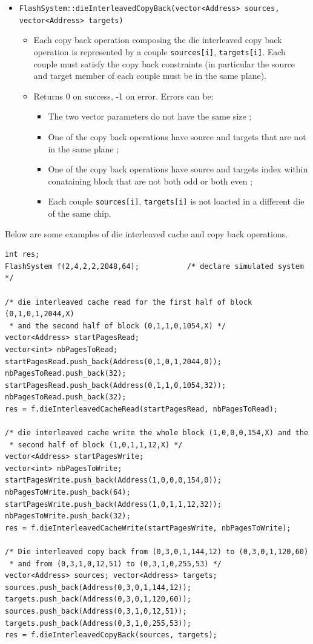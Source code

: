 \begin{itemize}
  \item \verb+FlashSystem::dieInterleavedCopyBack(vector<Address> sources,+\\\verb+vector<Address> targets)+
  \begin{itemize}
    \item Each copy back operation composing the die interleaved copy back operation is represented by a couple \verb+sources[i]+, \verb+targets[i]+. Each couple must satisfy the copy back constraints (in particular the source and target member of each couple must be in the same plane).
    \item Returns 0 on success, -1 on error. Errors can be:
    \begin{itemize}
      \item The two vector parameters do not have the same size ;
      \item One of the copy back operations have source and targets that are not in the same plane ;
      \item One of the copy back operations have source and targets index within conataining block that are not both odd or both even ;
      \item Each couple \verb+sources[i]+, \verb+targets[i]+ is not loacted in a different die of the same chip.
    \end{itemize}
  \end{itemize}
\end{itemize}

Below are some examples of die interleaved cache and copy back operations.

\begin{lstlisting}
int res;
FlashSystem f(2,4,2,2,2048,64);           /* declare simulated system */

/* die interleaved cache read for the first half of block (0,1,0,1,2044,X)
 * and the second half of block (0,1,1,0,1054,X) */
vector<Address> startPagesRead;
vector<int> nbPagesToRead;
startPagesRead.push_back(Address(0,1,0,1,2044,0)); nbPagesToRead.push_back(32);
startPagesRead.push_back(Address(0,1,1,0,1054,32)); nbPagesToRead.push_back(32);
res = f.dieInterleavedCacheRead(startPagesRead, nbPagesToRead);

/* die interleaved cache write the whole block (1,0,0,0,154,X) and the 
 * second half of block (1,0,1,1,12,X) */
vector<Address> startPagesWrite;
vector<int> nbPagesToWrite;
startPagesWrite.push_back(Address(1,0,0,0,154,0)); nbPagesToWrite.push_back(64);
startPagesWrite.push_back(Address(1,0,1,1,12,32)); nbPagesToWrite.push_back(32);
res = f.dieInterleavedCacheWrite(startPagesWrite, nbPagesToWrite);

/* Die interleaved copy back from (0,3,0,1,144,12) to (0,3,0,1,120,60)
 * and from (0,3,1,0,12,51) to (0,3,1,0,255,53) */
vector<Address> sources; vector<Address> targets;
sources.push_back(Address(0,3,0,1,144,12));
targets.push_back(Address(0,3,0,1,120,60));
sources.push_back(Address(0,3,1,0,12,51));
targets.push_back(Address(0,3,1,0,255,53));
res = f.dieInterleavedCopyBack(sources, targets);
\end{lstlisting}

